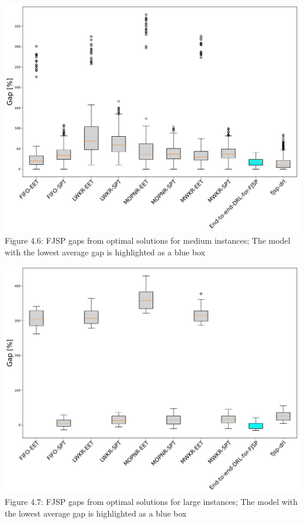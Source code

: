 \begin{center}
    \includegraphics[width=0.8\linewidth]{images/horizontal_boxplot_fjsp_medium.pdf}\\
    Figure 4.6: FJSP gaps from optimal solutions for medium instances; The model with the lowest average gap is highlighted as a blue box
\end{center}
\begin{center}
    \includegraphics[width=0.8\linewidth]{images/horizontal_boxplot_fjsp_large.pdf}\\
    Figure 4.7: FJSP gaps from optimal solutions for large instances; The model with the lowest average gap is highlighted as a blue box
\end{center}
